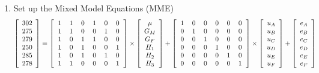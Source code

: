 \documentclass[12pt,a4paper]{paper}
\begin{document}
\begin{enumerate}
\begin{enumerate}
\item Set up the Mixed Model Equations (MME)
\[\left[\begin{array}{c}302\\275\\279\\250\\285\\278\\\end{array}\right] = \left[\begin{tabular}{rrrrrr}
1 & 1 & 0 & 1 & 0 & 0 \\ 
  1 & 1 & 0 & 0 & 1 & 0 \\ 
  1 & 0 & 1 & 1 & 0 & 0 \\ 
  1 & 0 & 1 & 0 & 0 & 1 \\ 
  1 & 0 & 1 & 0 & 1 & 0 \\ 
  1 & 1 & 0 & 0 & 0 & 1 \\ 
\end{tabular}\right] \times \left[\begin{array}{c}\mu\\G_{M}\\G_{F}\\H_{1}\\H_{2}\\H_{3} \end{array}\right] + \left[\begin{tabular}{rrrrrr}
1 & 0 & 0 & 0 & 0 & 0 \\ 
  0 & 1 & 0 & 0 & 0 & 0 \\ 
  0 & 0 & 1 & 0 & 0 & 0 \\ 
  0 & 0 & 0 & 1 & 0 & 0 \\ 
  0 & 0 & 0 & 0 & 1 & 0 \\ 
  0 & 0 & 0 & 0 & 0 & 1 \\ 
\end{tabular}\right] \times \left[\begin{array}{c}u_{A}\\u_{B}\\u_{C}\\u_{D}\\u_{E}\\u_{F}\\\end{array}\right] + \left[\begin{array}{c}e_{A}\\e_{B}\\e_{C}\\e_{D}\\e_{E}\\e_{F}\\\end{array}\right]\]

\end{enumerate}
\end{enumerate}
\end{document}
